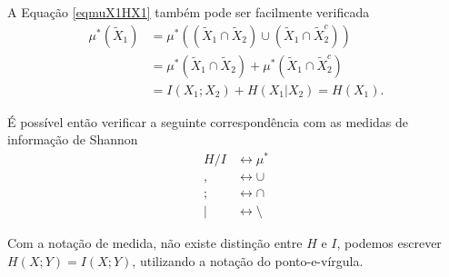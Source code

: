 A Equação \ref{eqmuX1HX1} também pode ser facilmente verificada
\begin{subequations}
  \begin{align}
  \mu^\ast(\tilde{X}_1) &= \mu^\ast( (\tilde{X}_1 \cap \tilde{X}_2) \cup (\tilde{X}_1 \cap \tilde{X}_2^c) ) \nonumber \\
        &= \mu^\ast(\tilde{X}_1 \cap \tilde{X}_2) + \mu^\ast(\tilde{X}_1 \cap \tilde{X}_2^c) \nonumber \\
        &= I(X_1;X_2) + H(X_1|X_2) = H(X_1) .
  \end{align}
\end{subequations}

  É possível então verificar a seguinte correspondência com as medidas de informação de Shannon
  \begin{subequations}
  \begin{align}
  H / I &\leftrightarrow \mu^\ast \\
  , &\leftrightarrow \cup \\
  ; &\leftrightarrow \cap \\
  | &\leftrightarrow \setminus
  \end{align}
  \end{subequations}

Com a notação de medida, não existe distinção entre $H$ e $I$, podemos escrever
$H(X;Y) = I(X;Y)$, utilizando a notação do ponto-e-vírgula.




